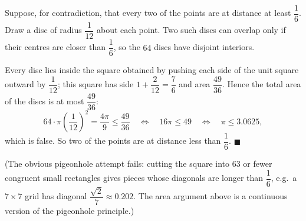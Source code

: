 Suppose, for contradiction, that every two of the points are at distance at least $\dfrac{1}{6}$. Draw a disc of radius $\dfrac{1}{12}$ about each point. Two such discs can overlap only if their centres are closer than $\dfrac{1}{6}$, so the $64$ discs have disjoint interiors.

Every disc lies inside the square obtained by pushing each side of the unit square outward by $\dfrac{1}{12}$; this square has side $1+\dfrac{2}{12}=\dfrac{7}{6}$ and area $\dfrac{49}{36}$. Hence the total area of the discs is at most $\dfrac{49}{36}$:
\[
64\cdot\pi\left(\dfrac{1}{12}\right)^2=\dfrac{4\pi}{9}\le\dfrac{49}{36}\quad\Longleftrightarrow\quad 16\pi\le49\quad\Longleftrightarrow\quad\pi\le3.0625,
\]
which is false. So two of the points are at distance less than $\dfrac{1}{6}$. $\blacksquare$

(The obvious pigeonhole attempt fails: cutting the square into $63$ or fewer congruent small rectangles gives pieces whose diagonals are longer than $\dfrac{1}{6}$, e.g.\ a $7\times7$ grid has diagonal $\dfrac{\sqrt2}{7}\approx0.202$. The area argument above is a continuous version of the pigeonhole principle.)
